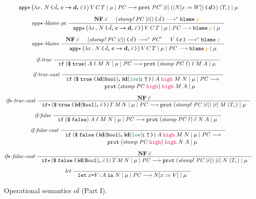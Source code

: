 \begin{figure}[tbp]
{\begin{gather*}
  {\reduce{\ccappstar{\left(\cccast{\cclam{x}{N}}{\coerc{\funco{\bar{d}}{\bm{c}}{\bm{d}}}{\bar{c}}}\right)}{V}{C}{T}}{\mu}{\PC}{\ccprot{\PC'}{|\bar{c}|}{(\cccast{(N [x := W])}{\bm{d}})}{(T_{\unk})}}{\mu}}
  \\[1ex]
  \textit{app}{\star}\textit{-blame-pc}~
  \inference{\mathbf{NF}\;\bar{c} & \cccast{(\textit{stamp!}\;\PC\;|\bar{c}|)}{\bar{d}} \longrightarrow^{*} \blame{p}}
  {\reduce{\ccappstar{\left(\cccast{\cclam{x}{N}}{\coerc{\funco{\bar{d}}{\bm{c}}{\bm{d}}}{\bar{c}}}\right)}{V}{C}{T}}{\mu}{\PC}{\blame{p}}{\mu}}
  \\[1ex]
  \textit{app}{\star}\textit{-blame}~
  \inference{\mathbf{NF}\;\bar{c} & \cccast{(\textit{stamp!}\;\PC\;|\bar{c}|)}{\bar{d}} \longrightarrow^{*} \PC' & \cccast{V}{\bm{c}} \longrightarrow^{*} \blame{p}}
  {\reduce{\ccappstar{\left(\cccast{\cclam{x}{N}}{\coerc{\funco{\bar{d}}{\bm{c}}{\bm{d}}}{\bar{c}}}\right)}{V}{C}{T}}{\mu}{\PC}{\blame{p}}{\mu}}
  \\[1ex]
  \textit{if-true}~
  \inference{}{\reduce{\ccif{(\ccconst{\true})}{A}{\ell}{M}{N}}{\mu}{\PC}{\ccprot{(\mathit{stamp}\;\PC\;\ell)}{\ell}{M}{A}}{\mu}}
  \\[1ex]
  \textit{if-true-cast}~
  \inference{}{
    \begin{split}
      \ccif{\left(\cccast{\ccconst{\true}}{\coerc{\id{\Bool}}{\id{\low}\seq\up}}\right)}{A}{\high}{M}{N} &\mid \mu \mid \PC \longrightarrow \\
           {\ccprot{(\mathit{stamp}\;\PC\;\high)}{\high}{M}{A}} &\mid \mu
    \end{split}}
  \\[1.5ex]
  \textit{if}{\star}\textit{-true-cast}~
  \inference{\mathbf{NF}\;\bar{c}}{\reduce{\ccifstar{\left(\cccast{\ccconst{\true}}{\coerc{\id{\Bool}}{\bar{c}}}\right)}{T}{M}{N}}{\mu}{\PC}{\ccprot{(\mathit{stamp!}\;\PC\;|\bar{c}|)}{|\bar{c}|}{M}{(T_{\unk})}}{\mu}}
  \\[1ex]
  \textit{if-false}~
  \inference{}{\reduce{\ccif{(\ccconst{\false})}{A}{\ell}{M}{N}}{\mu}{\PC}{\ccprot{(\mathit{stamp}\;\PC\;\ell)}{\ell}{N}{A}}{\mu}}
  \\[1ex]
  \textit{if-false-cast}~
  \inference{}{
    \begin{split}
      \ccif{\left(\cccast{\ccconst{\false}}{\coerc{\id{\Bool}}{\id{\low}\seq\up}}\right)}{A}{\high}{M}{N} &\mid \mu \mid \PC \longrightarrow \\
      \ccprot{(\mathit{stamp}\;\PC\;\high)}{\high}{N}{A} &\mid \mu
    \end{split}}
  \\[1.5ex]
  \textit{if}{\star}\textit{-false-cast}~
  \inference{\mathbf{NF}\;\bar{c}}{\reduce{\ccifstar{\left(\cccast{\ccconst{\false}}{\coerc{\id{\Bool}}{\bar{c}}}\right)}{T}{M}{N}}{\mu}{\PC}{\ccprot{(\mathit{stamp!}\;\PC\;|\bar{c}|)}{|\bar{c}|}{N}{(T_{\unk})}}{\mu}}
  \\[1ex]
  \textit{let}~
  \inference{}{\reduce{\cclet{x}{V}{A}{N}}{\mu}{\PC}{N[x:=V]}{\mu}}
  \end{gather*}}
  \caption{Operational semantics of \CC (Part I).}
  \label{fig:reduction-full-1}
\end{figure}


